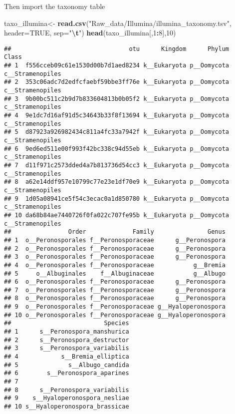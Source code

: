 \documentclass[
]{article}
\newenvironment{Shaded}{\begin{snugshade}}{\end{snugshade}}
\newcommand{\AttributeTok}[1]{\textcolor[rgb]{0.13,0.29,0.53}{#1}}
\newcommand{\ConstantTok}[1]{\textcolor[rgb]{0.56,0.35,0.01}{#1}}
\newcommand{\DecValTok}[1]{\textcolor[rgb]{0.00,0.00,0.81}{#1}}
\newcommand{\FunctionTok}[1]{\textcolor[rgb]{0.13,0.29,0.53}{\textbf{#1}}}
\newcommand{\NormalTok}[1]{#1}
\newcommand{\OtherTok}[1]{\textcolor[rgb]{0.56,0.35,0.01}{#1}}
\newcommand{\SpecialCharTok}[1]{\textcolor[rgb]{0.81,0.36,0.00}{\textbf{#1}}}
\newcommand{\StringTok}[1]{\textcolor[rgb]{0.31,0.60,0.02}{#1}}
\begin{document}
Then import the taxonomy table

\begin{Shaded}
\begin{Highlighting}[]
\NormalTok{taxo\_illumina}\OtherTok{\textless{}{-}} \FunctionTok{read.csv}\NormalTok{(}\StringTok{"Raw\_data/Illumina/illumina\_taxonomy.tsv"}\NormalTok{, }
                        \AttributeTok{header=}\ConstantTok{TRUE}\NormalTok{, }\AttributeTok{sep=}\StringTok{"}\SpecialCharTok{\textbackslash{}t}\StringTok{"}\NormalTok{)}
\FunctionTok{head}\NormalTok{(taxo\_illumina[,}\DecValTok{1}\SpecialCharTok{:}\DecValTok{8}\NormalTok{],}\DecValTok{10}\NormalTok{)}
\end{Highlighting}
\end{Shaded}

\begin{verbatim}
##                                 otu      Kingdom      Phylum            Class
## 1  f556cceb09c61e1530d00b7d1aed8234 k__Eukaryota p__Oomycota c__Stramenopiles
## 2  353c06adc7d2edfcfaebf59bbe3ff76e k__Eukaryota p__Oomycota c__Stramenopiles
## 3  9b00bc511c2b9d7b833604813b0b05f2 k__Eukaryota p__Oomycota c__Stramenopiles
## 4  9e1dc7d16af91d5c34643b33f8f13694 k__Eukaryota p__Oomycota c__Stramenopiles
## 5  d87923a926982434c811a4fc33a7942f k__Eukaryota p__Oomycota c__Stramenopiles
## 6  9ed6ed511e00f993f42bc338c94d55eb k__Eukaryota p__Oomycota c__Stramenopiles
## 7  d11f971c2573dded4a7b813736d54cc3 k__Eukaryota p__Oomycota c__Stramenopiles
## 8  a62e14ddf957e10799c77e23e1df70e9 k__Eukaryota p__Oomycota c__Stramenopiles
## 9  1d05a08941ce5f54c3ecac0a1d850780 k__Eukaryota p__Oomycota c__Stramenopiles
## 10 da68b84ae7440726f0fa022c707fe95b k__Eukaryota p__Oomycota c__Stramenopiles
##                Order             Family               Genus
## 1  o__Peronosporales f__Peronosporaceae      g__Peronospora
## 2  o__Peronosporales f__Peronosporaceae      g__Peronospora
## 3  o__Peronosporales f__Peronosporaceae      g__Peronospora
## 4  o__Peronosporales f__Peronosporaceae           g__Bremia
## 5     o__Albuginales    f__Albuginaceae           g__Albugo
## 6  o__Peronosporales f__Peronosporaceae      g__Peronospora
## 7  o__Peronosporales f__Peronosporaceae      g__Peronospora
## 8  o__Peronosporales f__Peronosporaceae      g__Peronospora
## 9  o__Peronosporales f__Peronosporaceae g__Hyaloperonospora
## 10 o__Peronosporales f__Peronosporaceae g__Hyaloperonospora
##                          Species
## 1      s__Peronospora_manshurica
## 2      s__Peronospora_destructor
## 3      s__Peronospora_variabilis
## 4            s__Bremia_elliptica
## 5              s__Albugo_candida
## 6        s__Peronospora_aparines
## 7                               
## 8      s__Peronospora_variabilis
## 9    s__Hyaloperonospora_nesliae
## 10 s__Hyaloperonospora_brassicae
\end{verbatim}
\end{document}
